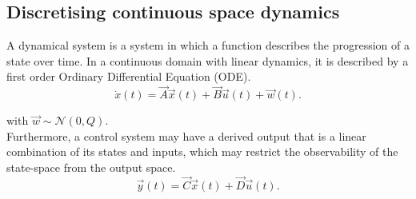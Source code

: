 \documentclass[runningheads,a4paper]{llncs}
\begin{document}
\subsection{Discretising continuous space dynamics}

A dynamical system is a system in which a function describes the progression of a state over time. 
In a continuous domain with linear dynamics, it is described by a first order Ordinary Differential Equation (ODE).
\begin{equation}
\dot{x}(t)=\vec{A}\vec{x}(t)+\vec{B}\vec{u}(t) +\vec{w}(t).
\label{eq:dynamical}
\end{equation}

\noindent with $\vec{w} \sim \mathcal{N}(0,Q)$.\\
Furthermore, a control system may have a derived output that is a linear combination of its states and inputs, 
which may restrict the observability of the state-space from the output space.
\begin{equation}
\vec{y}(t)=\vec{C}\vec{x}(t)+\vec{D}\vec{u}(t).
\end{equation}
\end{document}
